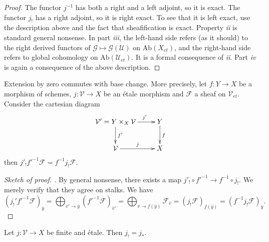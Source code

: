 \begin{proof}
The functor $j^{-1}$ has both a right and a left adjoint, so it is exact. The functor $j_!$ has a right adjoint, so it is right exact. To see that it is left exact, use the description above and the fact that sheafification is exact. Property {\it ii} is standard general nonsense. In part {\it iii}, the left-hand side refers (as it should) to the right derived functors of $\mathcal{G}\mapsto \mathcal{G}(\mathcal{U})$ on $\text{Ab}(X_{et})$, and the right-hand side refers to global cohomology on $\text{Ab}(\mathcal{U}_{et})$. It is a formal consequence of {\it ii}. Part {\it iv} is again a consequence of the above description.
\end{proof}

\begin{lemma} \label{lem:shriekCommutesWithBaseChange}
Extension by zero commutes with base change. More precisely, let $f: Y \to X$ be a morphism of schemes, $j: \mathcal{V} \to X$ be an \'etale morphism and $\mathcal{F}$ a sheaf on $\mathcal{V}_{et}$. Consider the cartesian diagram 
$$
\xymatrix{
{\mathcal{V}'=Y\times_X \mathcal{V}} \ar^{f'}[d] \ar^{\qquad j'}[r] & {Y} \ar^{f}[d] \\
{\mathcal{V}} \ar^{j}[r] & {X}
}
$$
then $j'_! f'^{-1}\mathcal{F} = f^{-1}j_!\mathcal{F}$.
\end{lemma}

\begin{proof}[Sketch of proof. ]
By general nonsense, there exists a map $j'_! \circ f'^{-1} \to f^{-1}\circ j_!$. We merely verify that they agree on stalks. We have
$$
\left(j_!'f'^{-1}\mathcal{F}\right)_{\bar y}  = 
\bigoplus_{\bar v' \to \bar y} (f'^{-1}\mathcal{F})_{\bar v'} =
\bigoplus_{\bar v \to f(\bar y)} \mathcal{F}_{\bar v} = 
(j_!\mathcal{F})_{f(\bar y)} =  
(f^{-1}j_!\mathcal{F})_{\bar y}.
$$
\end{proof}

\begin{lemma} \label{lem:ShriekEqualsStarForFiniteEtale}
Let $j: \mathcal{V}\to X$ be finite and \'etale. Then $j_! = j_*$.
\end{lemma}

